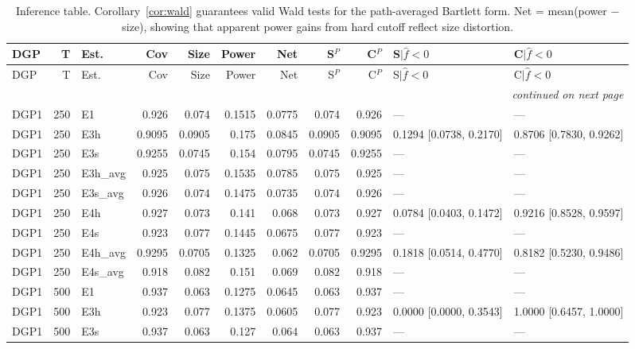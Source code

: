 \begin{scriptsize}\setlength{\tabcolsep}{3pt}
\begin{longtable}{lrlrrrrrrll}
\caption{Inference table. Corollary~\ref{cor:wald} guarantees valid Wald tests for the path-averaged Bartlett form. Net = mean(power $-$ size), showing that apparent power gains from hard cutoff reflect size distortion.}
\label{tab:mc_inference}\\
\toprule
DGP & T & Est. & Cov & Size & Power & Net & S$^P$ & C$^P$ & S$|\hat f\!<\!0$ & C$|\hat f\!<\!0$ \\
\midrule
\endfirsthead
\toprule
DGP & T & Est. & Cov & Size & Power & Net & S$^P$ & C$^P$ & S$|\hat f\!<\!0$ & C$|\hat f\!<\!0$ \\
\midrule
\endhead
\midrule
\multicolumn{11}{r}{\emph{continued on next page}}\\
\endfoot
\bottomrule
\endlastfoot
DGP1 & 250 & E1 & 0.926 & 0.074 & 0.1515 & 0.0775 & 0.074 & 0.926 & --- & --- \\
DGP1 & 250 & E3h & 0.9095 & 0.0905 & 0.175 & 0.0845 & 0.0905 & 0.9095 & 0.1294 [0.0738, 0.2170] & 0.8706 [0.7830, 0.9262] \\
DGP1 & 250 & E3s & 0.9255 & 0.0745 & 0.154 & 0.0795 & 0.0745 & 0.9255 & --- & --- \\
DGP1 & 250 & E3h_avg & 0.925 & 0.075 & 0.1535 & 0.0785 & 0.075 & 0.925 & --- & --- \\
DGP1 & 250 & E3s_avg & 0.926 & 0.074 & 0.1475 & 0.0735 & 0.074 & 0.926 & --- & --- \\
DGP1 & 250 & E4h & 0.927 & 0.073 & 0.141 & 0.068 & 0.073 & 0.927 & 0.0784 [0.0403, 0.1472] & 0.9216 [0.8528, 0.9597] \\
DGP1 & 250 & E4s & 0.923 & 0.077 & 0.1445 & 0.0675 & 0.077 & 0.923 & --- & --- \\
DGP1 & 250 & E4h_avg & 0.9295 & 0.0705 & 0.1325 & 0.062 & 0.0705 & 0.9295 & 0.1818 [0.0514, 0.4770] & 0.8182 [0.5230, 0.9486] \\
DGP1 & 250 & E4s_avg & 0.918 & 0.082 & 0.151 & 0.069 & 0.082 & 0.918 & --- & --- \\
DGP1 & 500 & E1 & 0.937 & 0.063 & 0.1275 & 0.0645 & 0.063 & 0.937 & --- & --- \\
DGP1 & 500 & E3h & 0.923 & 0.077 & 0.1375 & 0.0605 & 0.077 & 0.923 & 0.0000 [0.0000, 0.3543] & 1.0000 [0.6457, 1.0000] \\
DGP1 & 500 & E3s & 0.937 & 0.063 & 0.127 & 0.064 & 0.063 & 0.937 & --- & --- \\

\end{longtable}
\end{scriptsize}
